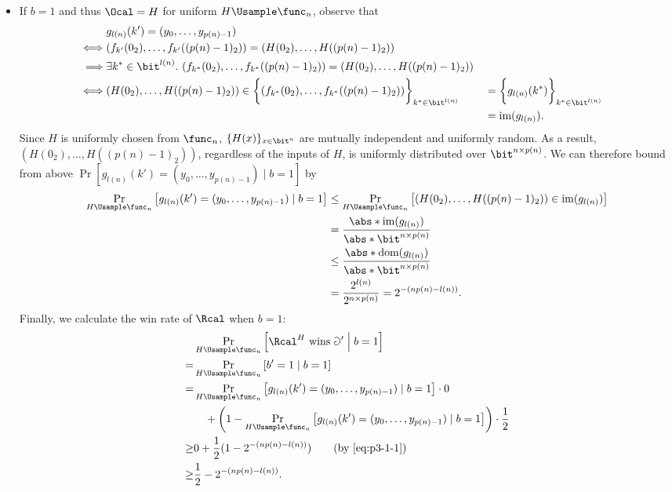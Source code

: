 \begin{answer}[a]
\begin{itemize}
        \item If $b=1$ and thus $\Ocal = H$ for uniform $H\Usample\func_n$, observe that
        \begin{align*}
            &g_{l(n)}(k')=(y_0,\ldots,y_{p(n)-1})  \\
            \iff& (f_{k'}(0_2),\ldots, f_{k'}((p(n)-1)_2))=(H(0_2),\ldots,H((p(n)-1)_2)) \\
            \implies& \exists k^\ast\in\bit^{l(n)}.\ (f_{k^\ast}(0_2),\ldots, f_{k^\ast}((p(n)-1)_2))=(H(0_2),\ldots,H((p(n)-1)_2))\\
            \iff& (H(0_2),\ldots,H((p(n)-1)_2)) \in \biggl\{ (f_{k^\ast}(0_2),\ldots, f_{k^\ast}((p(n)-1)_2))  \biggr\}_{k^\ast \in \bit^{l(n)}}
            &&=\biggl\{ g_{l(n)}(k^\ast) \biggr\}_{k^\ast \in \bit^{l(n)}}\\
            &&&=\mathop{\textrm{im}} (g_{l(n)}).
        \end{align*}
        Since $H$ is uniformly chosen from $\func_n$, $\{H(x)\}_{x\in\bit^n}$ are mutually independent and uniformly random. As a result, $(H(0_2),\ldots,H((p(n)-1)_2))$, regardless of the inputs of $H$, is uniformly distributed over $\bit^{n\times p(n)}$. We can therefore bound from above $\Pr[g_{l(n)}(k')=(y_0,\ldots,y_{p(n)-1}) \mid b=1]$ by 
        \begin{align}
            \Pr_{H\Usample\func_n}\left[g_{l(n)}(k')=(y_0,\ldots,y_{p(n)-1}) \mid b=1\right]
            &\le \Pr_{H\Usample\func_n}\left[(H(0_2),\ldots,H((p(n)-1)_2)) \in \mathop{\textrm{im}} (g_{l(n)}) \right]\notag\\
            &= \frac{\abs*{\mathop{\textrm{im}} (g_{l(n)})}}{\abs*{\bit^{n\times p(n)}}}\notag\\
            &\le \frac{\abs*{\mathop{\textrm{dom}} (g_{l(n)})}}{\abs*{\bit^{n\times p(n)}}}\notag\\
            &= \frac{2^{l(n)}}{2^{n\times p(n)}} 
            = 2^{-(np(n)-l(n))}. \label{eq:p3-1-1}
        \end{align}
        Finally, we calculate the win rate of $\Rcal$ when $b=1$:
        \begin{align*}
            &\Pr_{H\Usample\func_n}\left[ \Rcal^{H} \textrm{ wins } \Game' \Bigm\vert b=1\right]\\
            =& \Pr_{H\Usample\func_n}\left[ b' =1 \mid b=1\right]\\
            =& \Pr_{H\Usample\func_n}\left[ g_{l(n)}(k')=(y_0,\ldots,y_{p(n)-1}) \mid b=1\right] \cdot 0\\
            &\quad +\left(1-\Pr_{H\Usample\func_n}\left[ g_{l(n)}(k')=(y_0,\ldots,y_{p(n)-1}) \mid b=1\right]\right) \cdot \frac{1}{2}\\
            \ge& 0+\frac{1}{2}(1-2^{-(np(n)-l(n))}) \qquad \textrm{(by \eqref{eq:p3-1-1})}\\
            \ge& \frac{1}{2} - 2^{-(np(n)-l(n))}.
        \end{align*}
    \end{itemize}


\end{answer}
